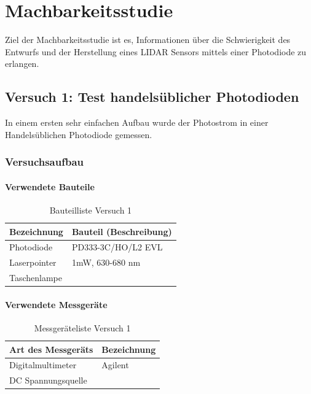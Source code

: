 \chapter{Machbarkeitsstudie}\label{chap:machbarkeitsstudie}
Ziel der Machbarkeitsstudie ist es, Informationen über die Schwierigkeit des Entwurfs und der Herstellung eines \ac{LIDAR} Sensors mittels einer Photodiode zu erlangen. 

\section{Versuch 1: Test handelsüblicher Photodioden}
In einem ersten sehr einfachen Aufbau wurde der Photostrom in einer Handelsüblichen Photodiode gemessen.
\subsection{Versuchsaufbau}
\subsubsection{Verwendete Bauteile}

\begin{table}[H]
	\centering
	\caption{Bauteilliste Versuch 1}
	\begin{tabular}{|l|l|}
		\hline
		\textbf{Bezeichnung} & \textbf{Bauteil (Beschreibung)}
		\\\hline
		Photodiode & PD333-3C/HO/L2 EVL
		\\\hline
		Laserpointer & 1mW, 630-680 nm
		\\\hline
		Taschenlampe & 
		\\\hline
	\end{tabular}
\end{table}

\subsubsection{Verwendete Messgeräte}
\begin{table}[H]
	\centering
	\caption{Messgeräteliste Versuch 1}
	\begin{tabular}{|l|l|}
		\hline
		\textbf{Art des Messgeräts} & \textbf{Bezeichnung}
		\\\hline
		Digitalmultimeter & Agilent
		\\\hline
		DC Spannungsquelle &
		\\\hline
	\end{tabular}
\end{table}

